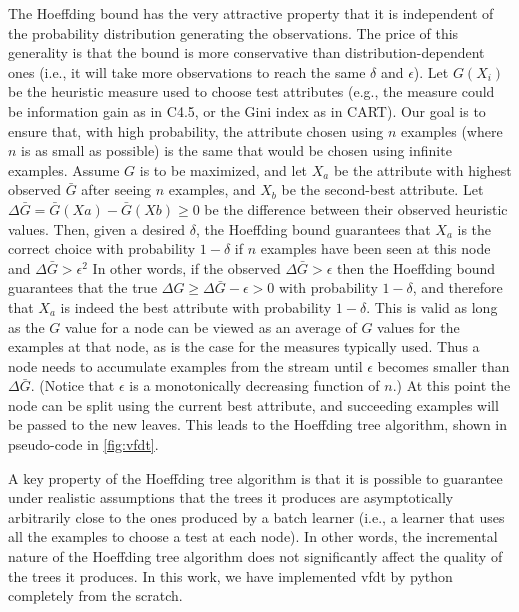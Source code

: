 \documentclass[sigplan]{acmart}\settopmatter{printfolios=true,printccs=false,printacmref=false}
\begin{document}
The Hoeffding bound has the very attractive property that it is independent of the probability distribution generating the observations. The price of this generality is that the bound is more conservative than distribution-dependent ones (i.e., it will take more observations to reach the same $\delta$ and $\epsilon$). Let $G(X_i)$ be the heuristic measure used to choose test attributes (e.g., the measure could be information gain as in C4.5, or the Gini index as in CART). Our goal is to ensure that, with high probability, the attribute chosen using $n$ examples (where $n$ is as small as possible) is the same that would be chosen using infinite examples. Assume $G$ is to be maximized, and let $X_a$ be the attribute with highest observed $\bar{G}$ after seeing $n$ examples, and $X_b$ be the second-best attribute. Let $\Delta \bar{G} = \bar{G}(Xa) - \bar{G}(Xb) \ge 0$ be the difference between their observed heuristic values. Then, given a desired $\delta$, the Hoeffding bound guarantees that $X_a$ is the correct choice with probability $1 - \delta$ if $n$ examples have been seen at this node and $\Delta \bar{G} > \epsilon^2$ In other words, if the observed $\Delta \bar{G} > \epsilon$ then the Hoeffding bound guarantees that the true $\Delta G \ge \Delta \bar{G} - \epsilon > 0$ with probability $1 - \delta$, and therefore that $X_a$ is indeed the best attribute with probability $1 - \delta$. This is valid as long as the $G$ value for a node can be viewed as an average of $G$ values for the examples at that node, as is the case for the measures typically used. Thus a node needs to accumulate examples from the stream until $\epsilon$ becomes smaller than $\Delta \bar{G}$. (Notice that $\epsilon$ is a monotonically decreasing function of $n$.) At this point the node can be split using the current best attribute, and succeeding examples will be passed to the new leaves. This leads to the Hoeffding tree algorithm, shown in pseudo-code in \ref{fig:vfdt}.


A key property of the Hoeffding tree algorithm is that it is possible to guarantee under realistic assumptions that the trees it produces are asymptotically arbitrarily close to the ones produced by a batch learner (i.e., a learner that uses all the examples to choose a test at each node). In other words, the incremental nature of the Hoeffding tree algorithm does not significantly affect the quality of the trees it produces. In this work, we have implemented vfdt by python completely from the scratch. 
\end{document}
